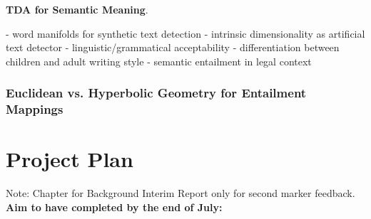 \documentclass[12pt,twoside]{report}
\begin{document}
\textbf{TDA for Semantic Meaning}. 


- word manifolds for synthetic text detection
- intrinsic dimensionality as artificial text detector
- linguistic/grammatical acceptability
- differentiation between children and adult writing style
- semantic entailment in legal context



\subsection{Euclidean vs. Hyperbolic Geometry for Entailment Mappings}



\chapter{Project Plan}
Note: Chapter for Background Interim Report only for second marker feedback. \newline \newline
\textbf{Aim to have completed by the end of July:}
\end{document}
